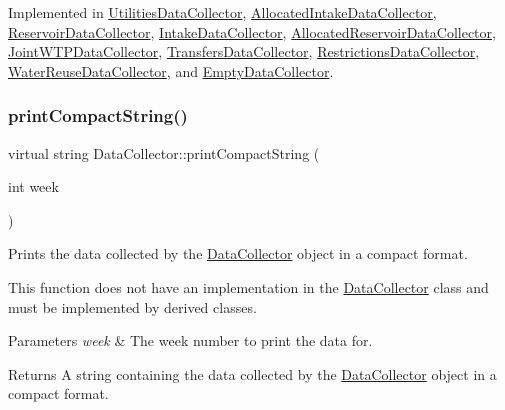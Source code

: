 Implemented in \mbox{\hyperlink{classUtilitiesDataCollector_ab72c4432d6816beb1f4f4b354fb3023d}{Utilities\+Data\+Collector}}, \mbox{\hyperlink{classAllocatedIntakeDataCollector_a06906344679fed5e3d24352e98107537}{Allocated\+Intake\+Data\+Collector}}, \mbox{\hyperlink{classReservoirDataCollector_a5c2e1355c40e45b409168e98245eef95}{Reservoir\+Data\+Collector}}, \mbox{\hyperlink{classIntakeDataCollector_aed1610e5419465b35041b05b9f60c212}{Intake\+Data\+Collector}}, \mbox{\hyperlink{classAllocatedReservoirDataCollector_a8ef8451d2cc6eb01b205eee75ab93729}{Allocated\+Reservoir\+Data\+Collector}}, \mbox{\hyperlink{classJointWTPDataCollector_a64383431902c18f1d90a33fbcc211658}{Joint\+W\+T\+P\+Data\+Collector}}, \mbox{\hyperlink{classTransfersDataCollector_a2f5c4427699aab547ea0d3b74993752b}{Transfers\+Data\+Collector}}, \mbox{\hyperlink{classRestrictionsDataCollector_a7d8b6433ec25a53ed50577c2cf89912d}{Restrictions\+Data\+Collector}}, \mbox{\hyperlink{classWaterReuseDataCollector_af4d8d437372c06d84ff889a5288cc96e}{Water\+Reuse\+Data\+Collector}}, and \mbox{\hyperlink{classEmptyDataCollector_a2993f4e00acd2eff18bed2e39108e89f}{Empty\+Data\+Collector}}.

\mbox{\label{classDataCollector_a2eac264fa5612aed5a830b12de4f4ae3}} 
\subsubsection{\texorpdfstring{print\+Compact\+String()}{printCompactString()}}
{\footnotesize\ttfamily virtual string Data\+Collector\+::print\+Compact\+String (\begin{DoxyParamCaption}\item[{int}]{week }\end{DoxyParamCaption})\hspace{0.3cm}{\ttfamily [pure virtual]}}



Prints the data collected by the \mbox{\hyperlink{classDataCollector}{Data\+Collector}} object in a compact format. 

This function does not have an implementation in the \mbox{\hyperlink{classDataCollector}{Data\+Collector}} class and must be implemented by derived classes.


\begin{DoxyParams}{Parameters}
{\em week} & The week number to print the data for. \\
\hline
\end{DoxyParams}
\begin{DoxyReturn}{Returns}
A string containing the data collected by the \mbox{\hyperlink{classDataCollector}{Data\+Collector}} object in a compact format. 
\end{DoxyReturn}


